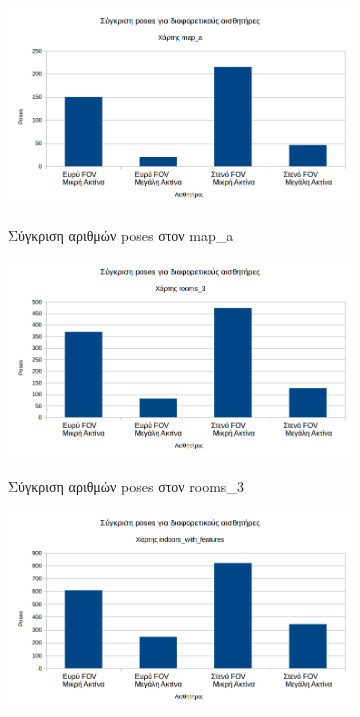 \begin{figure}[H]
     \centering
     \captionsetup{justification=centering}
     \begin{subfigure}[b]{0.5\textwidth}
         \centering
         \includegraphics[width=\textwidth]{./images/chapter6/map_a_poses_compare.png}
         \label{fig:map_a_poses_compare}
         \caption{Σύγκριση αριθμών poses στον map\_a}
     \end{subfigure}%
     \begin{subfigure}[b]{0.5\textwidth}
         \centering
         \includegraphics[width=\textwidth]{./images/chapter6/rooms_3_poses_compare.png}
         \label{fig:rooms_3_poses_compare}
         \caption{Σύγκριση αριθμών poses στον rooms\_3}
     \end{subfigure}
     \begin{subfigure}[b]{0.5\textwidth}
         \centering
         \includegraphics[width=\textwidth]{./images/chapter6/indoors_with_features_poses_compare.png}

\end{subfigure}
\end{figure}
